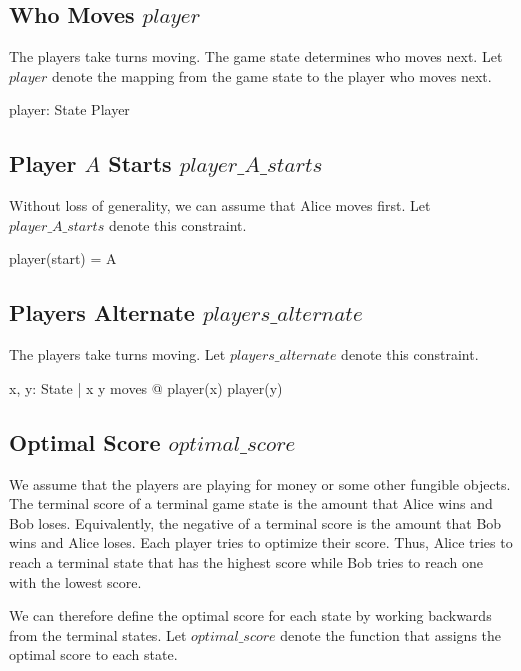 \documentclass[11pt, oneside]{article}
\begin{document}
\subsection{Who Moves $player$}

The players take turns moving.
The game state determines who moves next.
Let $player$ denote the mapping from the game state to the player who moves next.

\begin{axdef}
player: State \fun Player
\end{axdef}

\subsection{Player $A$ Starts $player\_A\_starts$}

Without loss of generality, we can assume that Alice moves first.
Let $player\_A\_starts$ denote this constraint.

\begin{zed}
player(start) = A
\end{zed}

\subsection{Players Alternate $players\_alternate$}

The players take turns moving.
Let $players\_alternate$ denote this constraint.

\begin{zed}
\forall x, y: State | x \mapsto y \in moves @ player(x) \neq player(y)
\end{zed}

\subsection{Optimal Score $optimal\_score$}

We assume that the players are playing for money or some other fungible objects.
The terminal score of a terminal game state is the amount that Alice wins and Bob loses.
Equivalently, the negative of a terminal score is the amount that Bob wins and Alice loses.
Each player tries to optimize their score.
Thus, Alice tries to reach a terminal state that has the highest score while
Bob tries to reach one with the lowest score.

We can therefore define the optimal score for each state by working backwards from the
terminal states.
Let $optimal\_score$ denote the function that assigns the optimal score to each state.
\end{document}
